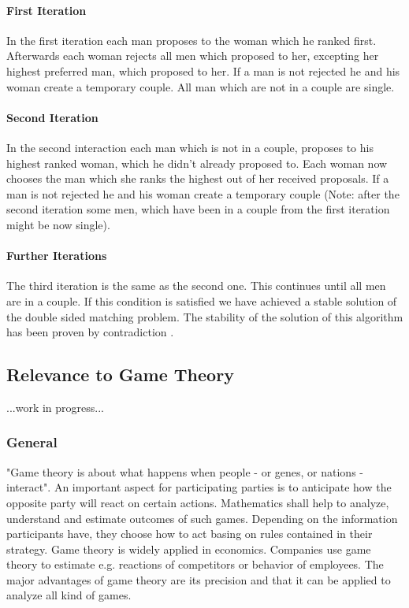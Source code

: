 \paragraph{First Iteration\\}
In the first iteration each man proposes to the woman which he ranked first.
Afterwards each woman rejects all men which proposed to her, excepting her highest preferred man, which proposed to her.
If a man is not rejected he and his woman create a temporary couple.
All man which are not in a couple are single.

\paragraph{Second Iteration\\}
In the second interaction each man which is not in a couple, proposes to his highest ranked woman, which he didn't already proposed to.
Each woman now chooses the man which she ranks the highest out of her received proposals.
If a man is not rejected he and his woman create a temporary couple (Note: after the second iteration some men, which have been in a couple from the first iteration might be now single).

\paragraph{Further Iterations\\}
The third iteration is the same as the second one.
This continues until all men are in a couple.
If this condition is satisfied we have achieved a stable solution of the double sided matching problem.
The stability of the solution of this algorithm has been proven by contradiction \cite[p. 12]{gale62a}.

\subsection{Relevance to Game Theory}
...work in progress...

\subsubsection{General}
"Game theory is about what happens when people - or genes, or nations - interact".
An important aspect for participating parties is to anticipate how the opposite party will react on certain actions.
Mathematics shall help to analyze, understand and estimate outcomes of such games. Depending on the information participants have, they choose how to act basing on rules contained in their strategy.
Game theory is widely applied in economics.
Companies use game theory to estimate e.g. reactions of competitors or behavior of employees.
The major advantages of game theory are its precision and that it can be applied to analyze all kind of games. \cite{camerer2003behavioral}

